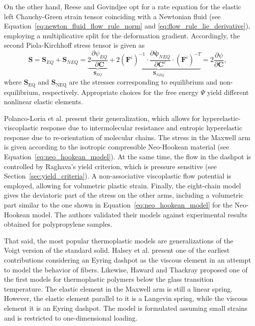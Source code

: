 On the other hand, Reese and Govindjee \citep{reeseTheoryFiniteViscoelasticity1998} opt for a rate equation for the elastic left Chauchy-Green strain tensor coinciding with a Newtonian fluid (see Equation~\eqref{eq:newton_fluid_flow_rule_norm} and \eqref{eq:flow_rule_lie_derivative}), employing a multiplicative split for the deformation gradient.
Accordingly, the second Piola-Kirchhoff stress tensor is given as
\begin{equation}
	\bm{S}=\bm{S}_{E Q}+\bm{S}_{N E Q}=\underbrace{2 \frac{\partial \psi_{E Q}}{\partial \bm{C}}}_{\bm{S}_{E Q}}+\underbrace{2 (\bm{F}^i)^{-1} \cdot \frac{\partial \bm{\psi}_{N E Q}}{\partial \bm{C}^e} \cdot (\bm{F}^i)^{-T}}_{\bm{S}_{N E Q}}=2 \frac{\partial \psi}{\partial \bm{C}},
\end{equation}
where $\bm S_\text{EQ}$ and $\bm S_\text{NEQ}$ are the stresses corresponding to equilibrium and non-equilibrium, respectively.
Appropriate choices for the free energy $\Psi$ yield different nonlinear elastic elements.

Polanco-Loria et al. \citep{polanco-loriaConstitutiveModelThermoplastics2010} present their generalization, which allows for hyperelastic-viscoplastic response due to intermolecular resistance and entropic hyperelastic response due to re-orientation of molecular chains.
The stress in the Maxwell arm is given according to the isotropic compressible Neo-Hookean material (see Equation~\eqref{eq:neo_hookean_model}).
At the same time, the flow in the dashpot is controlled by Raghava's yield criterion, which is pressure sensitive (see Section~\ref{sec:yield_criteria}).
A non-associative viscoplastic flow potential is employed, allowing for volumetric plastic strain.
Finally, the eight-chain model gives the deviatoric part of the stress on the other arms, including a volumetric part similar to the one shown in Equation~\eqref{eq:neo_hookean_model} for the Neo-Hookean model.
The authors validated their models against experimental results obtained for polypropylene samples.

That said, the most popular thermoplastic models are generalizations of the Voigt version of the standard solid.
Halsey et al. \citep{halseyMechanicalPropertiesTextiles1945} present one of the earliest contributions considering an Eyring dashpot as the viscous element in an attempt to model the behavior of fibers.
Likewise, Haward and Thackray \citep{hawardUseMathematicalModel1968} proposed one of the first models for thermoplastic polymers below the glass transition temperature.
The elastic element in the Maxwell arm is still a linear spring.
However, the elastic element parallel to it is a Langevin spring, while the viscous element it is an Eyring dashpot.
The model is formulated assuming small strains and is restricted to one-dimensional loading.

